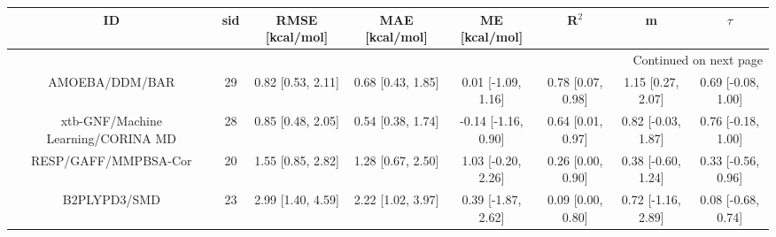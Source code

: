 \documentclass[8pt]{article}
\begin{document}
\begin{center}
\begin{footnotesize}
\begin{longtable}{|cccccccc|}
\toprule
                                 ID & sid &    RMSE [kcal/mol] &     MAE [kcal/mol] &        ME [kcal/mol] &              R$^2$ &                   m &              $\tau$ \\
\midrule
\endhead
\midrule
\multicolumn{8}{r}{{Continued on next page}} \\
\midrule
\endfoot

\bottomrule
\endlastfoot
                     AMOEBA/DDM/BAR &  29 &  0.82 [0.53, 2.11] &  0.68 [0.43, 1.85] &   0.01 [-1.09, 1.16] &  0.78 [0.07, 0.98] &   1.15 [0.27, 2.07] &  0.69 [-0.08, 1.00] \\
 xtb-GNF/Machine Learning/CORINA MD &  28 &  0.85 [0.48, 2.05] &  0.54 [0.38, 1.74] &  -0.14 [-1.16, 0.90] &  0.64 [0.01, 0.97] &  0.82 [-0.03, 1.87] &  0.76 [-0.18, 1.00] \\
               RESP/GAFF/MMPBSA-Cor &  20 &  1.55 [0.85, 2.82] &  1.28 [0.67, 2.50] &   1.03 [-0.20, 2.26] &  0.26 [0.00, 0.90] &  0.38 [-0.60, 1.24] &  0.33 [-0.56, 0.96] \\
                       B2PLYPD3/SMD &  23 &  2.99 [1.40, 4.59] &  2.22 [1.02, 3.97] &   0.39 [-1.87, 2.62] &  0.09 [0.00, 0.80] &  0.72 [-1.16, 2.89] &  0.08 [-0.68, 0.74] \\
\end{longtable}
\end{footnotesize}
\end{center}
\end{document}
